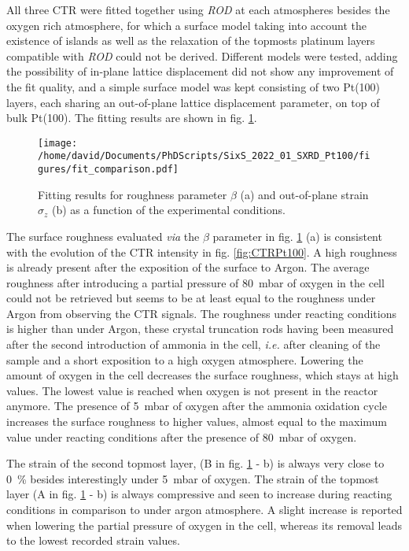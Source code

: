 All three CTR were fitted together using \textit{ROD} at each atmospheres besides the oxygen rich atmosphere, for which a surface model taking into account the existence of  islands as well as the relaxation of the topmosts platinum layers compatible with \textit{ROD} could not be derived.
Different models were tested, adding the possibility of in-plane lattice displacement did not show any improvement of the fit quality, and a simple surface model was kept consisting of two Pt(100) layers, each sharing an out-of-plane lattice displacement parameter, on top of bulk Pt(100).
The fitting results are shown in fig. \ref{fig:CTRFit100}.

\begin{figure}[!htb]
    \centering
    \texttt{[image: /home/david/Documents/PhDScripts/SixS\_2022\_01\_SXRD\_Pt100/figures/fit\_comparison.pdf]}
    \caption{
        Fitting results for roughness parameter $\beta$ (a) and out-of-plane strain $\sigma_z$ (b) as a function of the experimental conditions.
    }
    \label{fig:CTRFit100}
\end{figure}

The surface roughness evaluated \textit{via} the $\beta$ parameter in fig. \ref{fig:CTRFit100} (a) is consistent with the evolution of the CTR intensity in fig. \ref{fig:CTRPt100}.
A high roughness is already present after the exposition of the surface to Argon.
The average roughness after introducing a partial pressure of \qty{80}{\milli\bar} of oxygen in the cell could not be retrieved but seems to be at least equal to the roughness under Argon from observing the CTR signals.
The roughness under reacting conditions is higher than under Argon, these crystal truncation rods having been measured after the second introduction of ammonia in the cell, \textit{i.e.} after cleaning of the sample and a short exposition to a high oxygen atmosphere.
Lowering the amount of oxygen in the cell decreases the surface roughness, which stays at high values.
The lowest value is reached when oxygen is not present in the reactor anymore.
The presence of \qty{5}{\milli\bar} of oxygen after the ammonia oxidation cycle increases the surface roughness to higher values, almost equal to the maximum value under reacting conditions after the presence of \qty{80}{\milli\bar} of oxygen.

The strain of the second topmost layer, (B in fig. \ref{fig:CTRFit100} - b) is always very close to \qty{0}{\percent} besides interestingly under \qty{5}{\milli\bar} of oxygen.
The strain of the topmost layer (A in fig. \ref{fig:CTRFit100} - b) is always compressive and seen to increase during reacting conditions in comparison to under argon atmosphere.
A slight increase is reported when lowering the partial pressure of oxygen in the cell, whereas its removal leads to the lowest recorded strain values.

